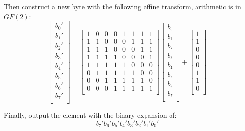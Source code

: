 Then construct a new byte with the following affine transform,
arithmetic is in $GF(2)$:
\[
\begin{bmatrix}
b_0'\\ b_1'\\ b_2'\\ b_3'\\ b_4'\\ b_5'\\ b_6'\\ b_7'\\
\end{bmatrix}
=
\begin{bmatrix}
	1&0&0&0&1&1&1&1\\
	1&1&0&0&0&1&1&1\\
	1&1&1&0&0&0&1&1\\
	1&1&1&1&0&0&0&1\\
	1&1&1&1&1&0&0&0\\
	0&1&1&1&1&1&0&0\\
	0&0&1&1&1&1&1&0\\
	0&0&0&1&1&1&1&1\\
\end{bmatrix}
\begin{bmatrix}
b_0\\ b_1\\ b_2\\ b_3\\ b_4\\ b_5\\ b_6\\ b_7\\
\end{bmatrix}
+
\begin{bmatrix}
1\\1\\0\\0\\0\\1\\1\\0\\
\end{bmatrix}
\]

Finally,
output the element with the binary expansion of:
\[b_7'b_6'b_5'b_4'b_3'b_2'b_1'b_0'\]

